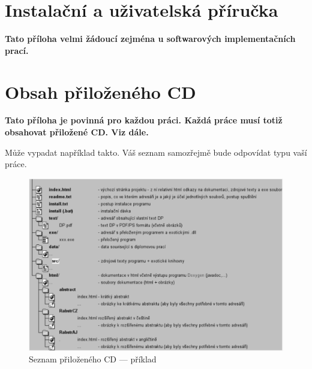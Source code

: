 \documentclass[11pt,twoside,a4paper]{book}
\begin{document}

\chapter{Instalační a uživatelská příručka}\label{chapt:manual}
\textbf{\large Tato příloha velmi žádoucí zejména u softwarových implementačních prací.}

\chapter{Obsah přiloženého CD}\label{chapt:obsah_cd}
\textbf{\large Tato příloha je povinná pro každou práci. Každá práce musí totiž obsahovat přiložené CD. Viz dále.}

Může vypadat například takto. Váš seznam samozřejmě bude odpovídat typu vaší práce. 

\begin{figure}[H]
\begin{center}
\includegraphics[width=14cm]{figures/seznamcd}
\caption{Seznam přiloženého CD --- příklad}
\label{fig:seznamcd}
\end{center}
\end{figure}
\end{document}
